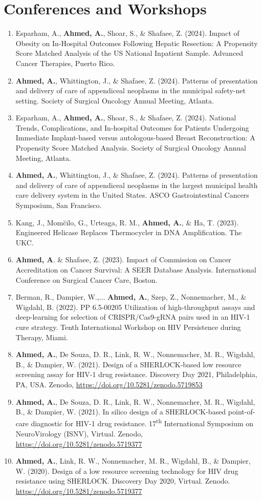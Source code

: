 \documentclass[letterpaper,11pt]{article}
\newcommand{\resumeItem}[2]{
  \item\small{
    \textbf{#1}{ #2 \vspace{-2pt}}
  }
}
\newcommand{\resumeSubItem}[2]{\resumeItem{#1}{#2}\vspace{-4pt}}
\begin{document}
\section{Conferences and Workshops}
  \begin{enumerate}[leftmargin=*]
  \resumeSubItem{}
    {Esparham, A., \textbf{Ahmed, A.}, Shoar, S., \& Shafaee, Z. (2024). Impact of Obesity on In-Hospital Outcomes Following Hepatic Resection: A Propensity Score Matched Analysis of the US National Inpatient Sample. Advanced Cancer Therapies, Puerto Rico.}
  \resumeSubItem{}
    {\textbf{Ahmed, A.}, Whittington, J., \& Shafaee, Z. (2024). Patterns of presentation and delivery of care of appendiceal neoplasms in the municipal safety-net setting. Society of Surgical Oncology Annual Meeting, Atlanta.}
  \resumeSubItem{}
    {Esparham, A., \textbf{Ahmed, A.}, Shoar, S., \& Shafaee, Z. (2024). National Trends, Complications, and In-hospital Outcomes for Patients Undergoing Immediate Implant-based versus autologous-based Breast Reconstruction: A Propensity Score Matched Analysis. Society of Surgical Oncology Annual Meeting, Atlanta.}
  \resumeSubItem{}
    {\textbf{Ahmed, A.}, Whittington, J., \& Shafaee, Z. (2024). Patterns of presentation and delivery of care of appendiceal neoplasms in the largest municipal health care delivery system in the United States. ASCO Gastrointestinal Cancers Symposium, San Francisco.}
  \resumeSubItem{}
    {Kang, J., Mom\u cilo, G., Urteaga, R. M., \textbf{Ahmed, A.}, \& Ha, T. (2023). Engineered Helicase Replaces Thermocycler in DNA Amplification. The UKC.}
  \resumeSubItem{}
    {\textbf{Ahmed, A}. \& Shafaee, Z. (2023). Impact of Commission on Cancer Accreditation on Cancer Survival: A SEER Database Analysis. International Conference on Surgical Cancer Care, Boston.}
  \resumeSubItem{}
    {Berman, R., Dampier, W.,... \textbf{Ahmed, A.}, Szep, Z., Nonnemacher, M., \& Wigdahl, B. (2022). PP 6.5-00205 Utilization of high-throughput assays and deep-learning for selection of CRISPR/Cas9-gRNA pairs used in an HIV-1 cure strategy. Tenth International Workshop on HIV Persistence during Therapy, Miami.}
  \resumeSubItem{}
    {\textbf{Ahmed, A.}, De Souza, D. R., Link, R. W., Nonnemacher, M. R., Wigdahl, B., \& Dampier, W. (2021). Design of a SHERLOCK-based low resource screening assay for HIV-1 drug resistance. Discovery Day 2021, Philadelphia, PA, USA. Zenodo, \href{https://doi.org/10.5281/zenodo.5719853}{https://doi.org/10.5281/zenodo.5719853}}
  \resumeSubItem{}
    {\textbf{Ahmed, A.}, De Souza, D. R., Link, R. W., Nonnemacher, M. R., Wigdahl, B., \& Dampier, W. (2021). In silico design of a SHERLOCK-based point-of-care diagnostic for HIV-1 drug resistance. 17\textsuperscript{th} International Symposium on NeuroVirology (ISNV), Virtual. Zenodo, \href{https://doi.org/10.5281/zenodo.5719377}{https://doi.org/10.5281/zenodo.5719377}}
  \resumeSubItem{}{\textbf{Ahmed, A.}, Link, R. W., Nonnemacher, M. R., Wigdahl, B., \& Dampier, W. (2020). Design of a low resource screening technology for HIV drug resistance using SHERLOCK. Discovery Day 2020, Virtual. Zenodo. \href{https://doi.org/10.5281/zenodo.5719377}{https://doi.org/10.5281/zenodo.5719377}}
  \end{enumerate}
  \vspace{-4pt}
\end{document}
